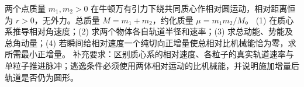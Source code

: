 两个点质量 \(m_1,m_2>0\) 在牛顿万有引力下绕共同质心作相对圆运动，相对距离恒为 \(r>0\)，无外力。总质量 \(M=m_1+m_2\)，约化质量 \(\mu=m_1m_2/M\)。
(1) 在质心系推导相对角速度；(2) 求两个物体各自轨道半径和速率；(3) 求总动能、势能及总角动量；(4) 若瞬间给相对速度一个纯切向正增量使总相对比机械能恰为零，求所需最小正增量。
补充要求：区别质心系的相对速度、各粒子的真实轨道速率与单粒子推进脉冲；逃逸条件必须使用两体相对运动的比机械能，并说明施加增量后轨道是否仍为圆形。
